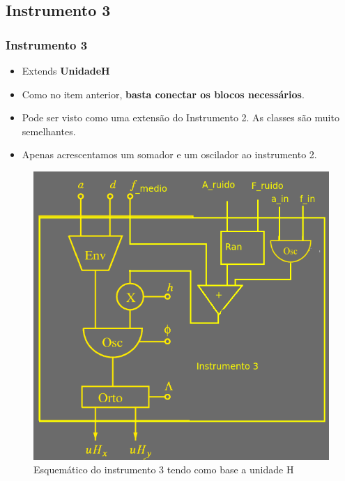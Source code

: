 \documentclass{beamer}
\begin{document}
\subsection{Instrumento 3}
\begin{frame}
 \frametitle{Instrumento 3}
  \begin{itemize}
 \item Extends \textbf{UnidadeH}
 \item Como no item anterior, \textbf{basta conectar os blocos necessários}.
 \item Pode ser visto como uma extensão do Instrumento 2. As classes são muito semelhantes.
 \item Apenas acrescentamos um somador e um oscilador ao instrumento 2.
 \end{itemize}
\end{frame}

\begin{frame}
 \begin{figure}
  \includegraphics[scale=0.4]{./images/instrumento3.png}
  \caption{Esquemático do instrumento 3 tendo como base a unidade H}
 \end{figure} 
\end{frame}
\end{document}
